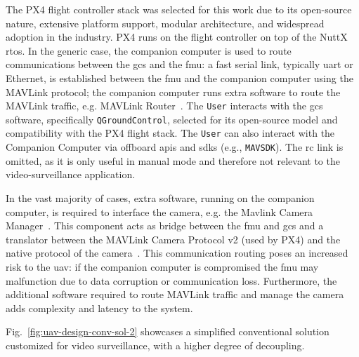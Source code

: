 The PX4 flight controller stack was selected for this work due to its
open-source nature, extensive platform support, modular architecture, and
widespread adoption in the industry. PX4 runs on the flight controller on top of
the NuttX \gls{rtos}. In the generic case, the companion computer is used to
route communications between the \gls{gcs} and the \gls{fmu}: a fast serial
link, typically \gls{uart} or Ethernet, is established between the \gls{fmu} and
the companion computer using the MAVLink protocol; the companion computer
runs extra software to route the MAVLink traffic,
e.g. MAVLink Router~\cite{px4-routers}.
%
The \lstinline{User} interacts with the \gls{gcs} software, specifically
\lstinline{QGroundControl}, selected for its open-source model and compatibility
with the PX4 flight stack. The \lstinline{User} can also interact with the
Companion Computer via offboard \glspl{api} and \glspl{sdk} (e.g.,
\lstinline{MAVSDK}). The \gls{rc} link is omitted, as it is only useful in
manual mode and therefore not relevant to the video-surveillance application.

In the vast majority of cases, extra software, running on the companion
computer, is required to interface the camera, e.g. the Mavlink Camera Manager~\cite{px4-cam-managers}. This
component acts as bridge between the \gls{fmu} and \gls{gcs} and a translator between the MAVLink Camera Protocol v2
(used by PX4) and the native protocol of the camera~\cite{px4-cam-managers}.
%
This communication routing poses an increased risk to the \gls{uav}: if the
companion computer is compromised the \gls{fmu} may malfunction due to data
corruption or communication loss. Furthermore, the additional software required
to route MAVLink traffic and manage the camera adds complexity and latency to
the system.

Fig.~\ref{fig:uav-design-conv-sol-2} showcases a simplified conventional
solution customized for video surveillance, with a higher degree of
decoupling.

